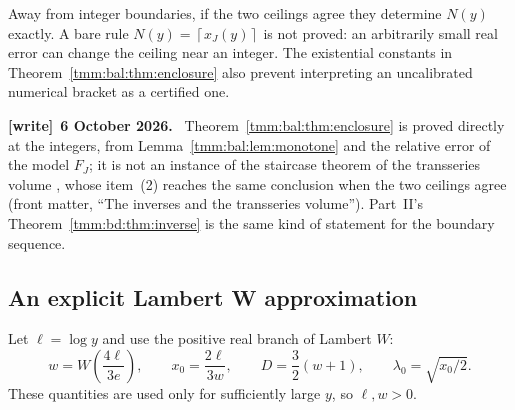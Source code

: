 \documentclass[11pt,letterpaper]{article}
\theoremstyle{remark}\newtheorem{remark}[theorem]{Remark}
\newcommand{\ceil}[1]{\left\lceil #1\right\rceil}
\newenvironment{writenote}[1][]{\par\smallskip\begingroup\small
 \noindent\textbf{[write]}\if\relax\detokenize{#1}\relax\else~\textbf{#1.}\fi\ }%
 {\par\endgroup\smallskip}
\begin{document}
Away from integer boundaries, if the two ceilings agree they determine $N(y)$ exactly. A bare rule $N(y)=\ceil{x_J(y)}$ is not proved: an arbitrarily small real error can change the ceiling near an integer. The existential constants in Theorem~\ref{tmm:bal:thm:enclosure} also prevent interpreting an uncalibrated numerical bracket as a certified one.
\begin{writenote}[6 October 2026]
Theorem~\ref{tmm:bal:thm:enclosure} is proved directly at the integers, from Lemma~\ref{tmm:bal:lem:monotone} and the relative error of the model $F_J$; it is not an instance of the staircase theorem of the transseries volume \cite{TSvol}, whose item~(2) reaches the same conclusion when the two ceilings agree (front matter, ``The inverses and the transseries volume''). Part~II's Theorem~\ref{tmm:bd:thm:inverse} is the same kind of statement for the boundary sequence.
\end{writenote}

\subsection{An explicit Lambert W approximation}
Let $\ell=\log y$ and use the positive real branch of Lambert $W$:
\begin{equation}\label{tmm:bal:eq:lambert}
 w=W\left(\frac{4\ell}{3e}\right),\qquad
 x_0=\frac{2\ell}{3w},\qquad
 D=\frac32(w+1),\qquad \lambda_0=\sqrt{x_0/2}.
\end{equation}
These quantities are used only for sufficiently large $y$, so $\ell,w>0$.
\end{document}

